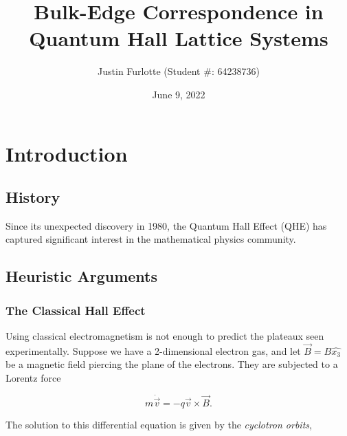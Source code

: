 \documentclass[12pt, letterpaper]{article}
\title{Bulk-Edge Correspondence in Quantum Hall Lattice Systems}
\author{Justin Furlotte (Student \#: 64238736)}
\date{June 9, 2022}
\begin{document}
\begin{titlepage}
\maketitle
\end{titlepage}

\newtheorem{theorem}{Theorem}
\newtheorem{corollary}{Corollary}
\newtheorem{lemma}{Lemma}
\newtheorem{proposition}{Proposition}
\newtheorem{assumption}{Assumption}
 
\newcommand{\C}{\mathbb{C}}
\newcommand{\Tr}{\text{Tr}}
\newcommand{\tr}{\text{tr}}
\newcommand{\eps}{\varepsilon}
\newcommand{\R}{\mathbb{R}}
\newcommand{\N}{\mathbb{N}}
\newcommand{\Z}{\mathbb{Z}}
\newcommand{\norm}[1]{\lVert #1 \rVert}
\newcommand{\One}{\mathbbm{1}}
\newcommand{\Var}{\text{Var}}
\newcommand{\F}{\mathcal{F}}
\newcommand{\G}{\mathcal{G}}
\newcommand{\U}{\mathcal{U}}


\graphicspath{ {c:/user/justin/grad school/Thesis} }

\section{Introduction}

\subsection{History}

Since its unexpected discovery in 1980, the Quantum Hall Effect (QHE) has captured significant interest in the mathematical physics community.

\subsection{Heuristic Arguments}

\subsubsection{The Classical Hall Effect}

Using classical electromagnetism is not enough to predict the plateaux seen experimentally. Suppose we have a 2-dimensional electron gas, and let $\vec{B} = B\hat{x_3}$ be a magnetic field piercing the plane of the electrons. They are subjected to a Lorentz force

\[m\dot{\vec{v}} = -q\vec{v}\times\vec{B} .\]

The solution to this differential equation is given by the \emph{cyclotron orbits},
\end{document}
